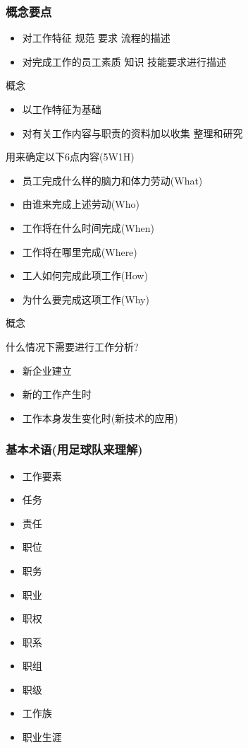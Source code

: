 \documentclass{ctexart}
\begin{document}
\subsubsection{概念要点}
\label{sec-1-1-4}
\begin{itemize}
\item 对工作特征 规范 要求 流程的描述
\item 对完成工作的员工素质 知识 技能要求进行描述
\end{itemize}
概念
\begin{itemize}
\item 以工作特征为基础
\item 对有关工作内容与职责的资料加以收集 整理和研究
\end{itemize}
用来确定以下6点内容(5W1H)
\begin{itemize}
\item 员工完成什么样的脑力和体力劳动(What)
\item 由谁来完成上述劳动(Who)
\item 工作将在什么时间完成(When)
\item 工作将在哪里完成(Where)
\item 工人如何完成此项工作(How)
\item 为什么要完成这项工作(Why)
\end{itemize}
概念

什么情况下需要进行工作分析?
\begin{itemize}
\item 新企业建立
\item 新的工作产生时
\item 工作本身发生变化时(新技术的应用)
\end{itemize}

\subsubsection{基本术语(用足球队来理解)}
\label{sec-1-1-5}
\begin{itemize}
\item 工作要素
\item 任务
\item 责任
\item 职位
\item 职务
\item 职业
\item 职权
\item 职系
\item 职组
\item 职级
\item 工作族
\item 职业生涯
\end{itemize}
\end{document}
